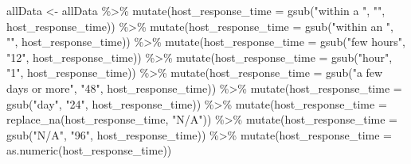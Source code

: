 \documentclass[
]{article}
\newenvironment{Shaded}{\begin{snugshade}}{\end{snugshade}}
\newcommand{\AttributeTok}[1]{\textcolor[rgb]{0.77,0.63,0.00}{#1}}
\newcommand{\FunctionTok}[1]{\textcolor[rgb]{0.00,0.00,0.00}{#1}}
\newcommand{\NormalTok}[1]{#1}
\newcommand{\OtherTok}[1]{\textcolor[rgb]{0.56,0.35,0.01}{#1}}
\newcommand{\SpecialCharTok}[1]{\textcolor[rgb]{0.00,0.00,0.00}{#1}}
\newcommand{\StringTok}[1]{\textcolor[rgb]{0.31,0.60,0.02}{#1}}
\begin{document}
\begin{Shaded}
\begin{Highlighting}[]
\NormalTok{allData }\OtherTok{\textless{}{-}}\NormalTok{ allData }\SpecialCharTok{\%\textgreater{}\%}
  \FunctionTok{mutate}\NormalTok{(}\AttributeTok{host\_response\_time =} \FunctionTok{gsub}\NormalTok{(}\StringTok{"within a "}\NormalTok{, }\StringTok{""}\NormalTok{, host\_response\_time)) }\SpecialCharTok{\%\textgreater{}\%}
  \FunctionTok{mutate}\NormalTok{(}\AttributeTok{host\_response\_time =} \FunctionTok{gsub}\NormalTok{(}\StringTok{"within an "}\NormalTok{, }\StringTok{""}\NormalTok{, host\_response\_time)) }\SpecialCharTok{\%\textgreater{}\%}
  \FunctionTok{mutate}\NormalTok{(}\AttributeTok{host\_response\_time =} \FunctionTok{gsub}\NormalTok{(}\StringTok{"few hours"}\NormalTok{, }\StringTok{"12"}\NormalTok{, host\_response\_time)) }\SpecialCharTok{\%\textgreater{}\%}
  \FunctionTok{mutate}\NormalTok{(}\AttributeTok{host\_response\_time =} \FunctionTok{gsub}\NormalTok{(}\StringTok{"hour"}\NormalTok{, }\StringTok{"1"}\NormalTok{, host\_response\_time)) }\SpecialCharTok{\%\textgreater{}\%}
  \FunctionTok{mutate}\NormalTok{(}\AttributeTok{host\_response\_time =} \FunctionTok{gsub}\NormalTok{(}\StringTok{"a few days or more"}\NormalTok{, }\StringTok{"48"}\NormalTok{, host\_response\_time)) }\SpecialCharTok{\%\textgreater{}\%}
  \FunctionTok{mutate}\NormalTok{(}\AttributeTok{host\_response\_time =} \FunctionTok{gsub}\NormalTok{(}\StringTok{"day"}\NormalTok{, }\StringTok{"24"}\NormalTok{, host\_response\_time)) }\SpecialCharTok{\%\textgreater{}\%}
  \FunctionTok{mutate}\NormalTok{(}\AttributeTok{host\_response\_time =} \FunctionTok{replace\_na}\NormalTok{(host\_response\_time, }\StringTok{"N/A"}\NormalTok{)) }\SpecialCharTok{\%\textgreater{}\%} 
  \FunctionTok{mutate}\NormalTok{(}\AttributeTok{host\_response\_time =} \FunctionTok{gsub}\NormalTok{(}\StringTok{"N/A"}\NormalTok{, }\StringTok{"96"}\NormalTok{, host\_response\_time)) }\SpecialCharTok{\%\textgreater{}\%}
  \FunctionTok{mutate}\NormalTok{(}\AttributeTok{host\_response\_time =} \FunctionTok{as.numeric}\NormalTok{(host\_response\_time))}


\end{Highlighting}
\end{Shaded}
\end{document}
